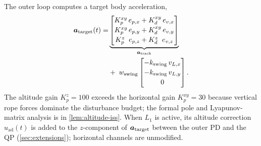 The outer loop computes a target body acceleration,
\begin{align}
\label{eq:a-target}
  \vect a_{\mathrm{target}}(t)
    =& \underbrace{%
        \begin{bmatrix}
          K_p^{xy}\, e_{p,x} + K_d^{xy}\, e_{v,x} \\[2pt]
          K_p^{xy}\, e_{p,y} + K_d^{xy}\, e_{v,y} \\[2pt]
          K_p^{z}\;\; e_{p,z} + K_d^{z}\;\; e_{v,z}
        \end{bmatrix}}_{\vect a_{\mathrm{track}}}\\
    &+\; w_{\mathrm{swing}}
      \begin{bmatrix}
        -k_{\mathrm{swing}}\, v_{L,x} \\[2pt]
        -k_{\mathrm{swing}}\, v_{L,y} \\[2pt]
        0
      \end{bmatrix}.\nonumber
\end{align}
The altitude gain $K_p^z = 100$ exceeds the horizontal gain $K_p^{xy} = 30$ because vertical rope forces dominate the disturbance budget; the formal pole and Lyapunov-matrix analysis is in \cref{lem:altitude-iss}. When $L_1$ is active, its altitude correction $u_{\mathrm{ad}}(t)$ is added to the $z$-component of $\boldsymbol{a}_{\mathrm{target}}$ between the outer PD and the QP (\cref{sec:extensions}); horizontal channels are unmodified.


